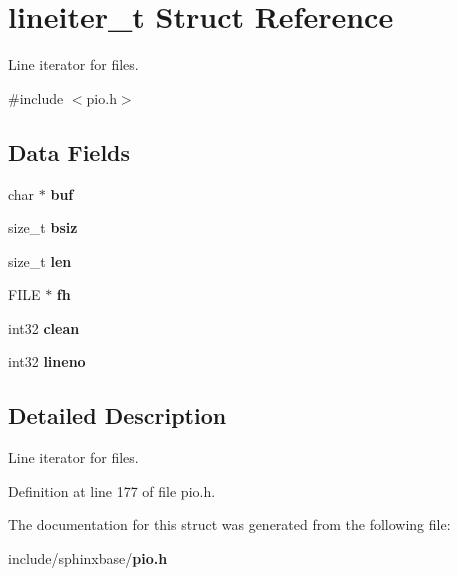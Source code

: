 \section{lineiter\-\_\-t \-Struct \-Reference}
\label{structlineiter__t}


\-Line iterator for files.  




{\ttfamily \#include $<$pio.\-h$>$}

\subsection*{\-Data \-Fields}
\begin{DoxyCompactItemize}
\item 
char $\ast$ {\bfseries buf}\label{structlineiter__t_a1bf482b3c2722af76102f7b4aae08e47}

\item 
size\-\_\-t {\bfseries bsiz}\label{structlineiter__t_ab9aef9582ea19e23370fab75981ae022}

\item 
size\-\_\-t {\bfseries len}\label{structlineiter__t_ad7faa6892d4a6d9e4e41c6d7dce4b590}

\item 
\-F\-I\-L\-E $\ast$ {\bfseries fh}\label{structlineiter__t_a08628d796a4850494f29f62dc0e55148}

\item 
int32 {\bfseries clean}\label{structlineiter__t_a800c26617f85d52aa4f3c8f6c3e6f96a}

\item 
int32 {\bfseries lineno}\label{structlineiter__t_ae8215b7dfb61b9718dab96c7c9d22311}

\end{DoxyCompactItemize}


\subsection{\-Detailed \-Description}
\-Line iterator for files. 

\-Definition at line 177 of file pio.\-h.



\-The documentation for this struct was generated from the following file\-:\begin{DoxyCompactItemize}
\item 
include/sphinxbase/{\bf pio.\-h}\end{DoxyCompactItemize}
